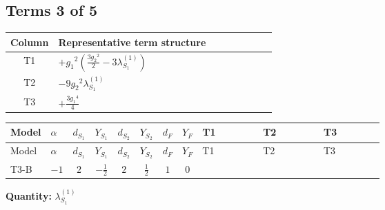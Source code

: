 \documentclass[8pt]{article}
\begin{document}
\begin{landscape}
\subsection*{Terms 3 of 5}
\begin{center}
\begin{tabular}{@{}c >{\raggedright\arraybackslash}p{0.82\linewidth}@{}}
\toprule
Column & Representative term structure \\
\midrule
T1 & \(\displaystyle +{g_1}^2 \left(\frac{3 {g_2}^2}{2}-3 {\lambda_{S_1}^{(1)}}\right)\) \\
\midrule
T2 & \(\displaystyle -9 {g_2}^2 {\lambda_{S_1}^{(1)}}\) \\
\midrule
T3 & \(\displaystyle +\frac{3 {g_1}^4}{4}\) \\
\midrule
\bottomrule
\end{tabular}
\end{center}
\smallskip
\tiny
\begin{longtable}{@{}llcccccc >{\raggedright\arraybackslash}p{0.21\linewidth} >{\raggedright\arraybackslash}p{0.21\linewidth} >{\raggedright\arraybackslash}p{0.21\linewidth}@{}}
\toprule
Model & $\alpha$ & $d_{S_1}$ & $Y_{S_1}$ & $d_{S_2}$ & $Y_{S_2}$ & $d_F$ & $Y_F$ & T1 & T2 & T3 \\
\midrule
\endfirsthead
\toprule
Model & $\alpha$ & $d_{S_1}$ & $Y_{S_1}$ & $d_{S_2}$ & $Y_{S_2}$ & $d_F$ & $Y_F$ & T1 & T2 & T3 \\
\midrule
\endhead
T3-B & $-1$ & $2$ & $-\frac{1}{2}$ & $2$ & $\frac{1}{2}$ & $1$ & $0$ & \scriptsize\adjustbox{max width=\linewidth}{$\begin{gathered} +{g_1}^2 \left(\frac{3 {g_2}^2}{2}-3 {\lambda_{S_1}^{(1)}}\right)\end{gathered}$} & \scriptsize\adjustbox{max width=\linewidth}{$\begin{gathered} -9 {g_2}^2 {\lambda_{S_1}^{(1)}}\end{gathered}$} & \scriptsize\adjustbox{max width=\linewidth}{$\begin{gathered} +\frac{3 {g_1}^4}{4}\end{gathered}$} \\
\midrule
\bottomrule
\end{longtable}
\clearpage
\noindent\textbf{Quantity: }$\lambda_{S_1}^{(1)}$\par\smallskip

\end{landscape}
\end{document}
